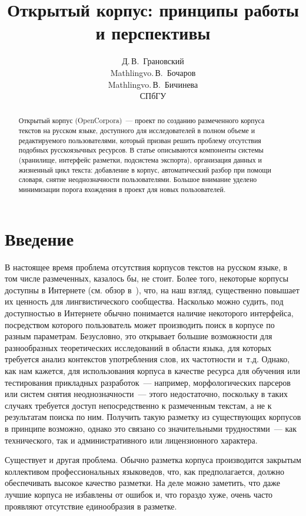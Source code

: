 \documentclass[a4paper]{article}
\begin{document}
\author{Д.\,В.~Грановский\\\small Mathlingvo.\,В.~Бочаров\\\small Mathlingvo.\,В.~Бичинева\\\small СПбГУ}
\title{Открытый корпус: принципы работы и перспективы}
\date{}
\maketitle
\begin{abstract}
Открытый корпус (OpenCorpora)~--- проект по созданию размеченного корпуса текстов на русском языке, доступного для исследователей в полном объеме и редактируемого пользователями, который призван решить проблему отсутствия подобных русскоязычных ресурсов. В статье описываются компоненты системы (хранилище, интерфейс разметки, подсистема экспорта), организация данных и жизненный цикл текста: добавление в корпус, автоматический разбор при помощи словаря, снятие неоднозначности пользователями. Большое внимание уделено минимизации порога вхождения в проект для новых пользователей.
\end{abstract}
\section{Введение}
В настоящее время проблема отсутствия корпусов текстов на русском языке, в том числе размеченных, казалось бы, не стоит. Более того, некоторые корпусы доступны в Интернете (см. обзор в~\cite{reznikova05}), что, на наш взгляд, существенно повышает их ценность для лингвистического сообщества. Насколько можно судить, под доступностью в Интернете обычно понимается наличие некоторого интерфейса, посредством которого пользователь может производить поиск в корпусе по разным параметрам. Безусловно, это открывает большие возможности для разнообразных теоретических исследований в области языка, для которых требуется анализ контекстов употребления слов, их частотности и~т.д. Однако, как нам кажется, для использования корпуса в качестве ресурса для обучения или тестирования прикладных разработок~--- например, морфологических парсеров или систем снятия неоднозначности~--- этого недостаточно, поскольку в таких случаях требуется доступ непосредственно к размеченным текстам, а не к результатам поиска по ним. Получить такую разметку из существующих корпусов в принципе возможно, однако это связано со значительными трудностями~--- как технического, так и административного или лицензионного характера.

Существует и другая проблема. Обычно разметка корпуса производится закрытым коллективом профессиональных языковедов, что, как предполагается, должно обеспечивать высокое качество разметки. На деле можно заметить, что даже лучшие корпуса не избавлены от ошибок и, что гораздо хуже, очень часто проявляют отсутствие единообразия в разметке.
\end{document}
